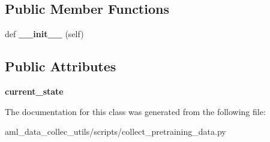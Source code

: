 \subsection*{Public Member Functions}
\begin{DoxyCompactItemize}
\item 
\hypertarget{classscripts_1_1collect__pretraining__data_1_1_agent_proxy_af24d25e7cced9bc87e840f6148337f89}{}\label{classscripts_1_1collect__pretraining__data_1_1_agent_proxy_af24d25e7cced9bc87e840f6148337f89} 
def {\bfseries \+\_\+\+\_\+init\+\_\+\+\_\+} (self)
\end{DoxyCompactItemize}
\subsection*{Public Attributes}
\begin{DoxyCompactItemize}
\item 
\hypertarget{classscripts_1_1collect__pretraining__data_1_1_agent_proxy_a5c0b380f09c4cba0dc94b541ca1b8671}{}\label{classscripts_1_1collect__pretraining__data_1_1_agent_proxy_a5c0b380f09c4cba0dc94b541ca1b8671} 
{\bfseries current\+\_\+state}
\end{DoxyCompactItemize}


The documentation for this class was generated from the following file\+:\begin{DoxyCompactItemize}
\item 
aml\+\_\+data\+\_\+collec\+\_\+utils/scripts/collect\+\_\+pretraining\+\_\+data.\+py\end{DoxyCompactItemize}
